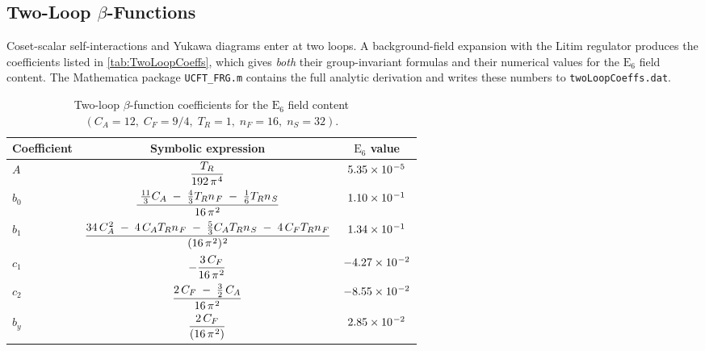 \documentclass[pdflatex,sn-mathphys-num]{sn-jnl}
\theoremstyle{thmstyleone}
\theoremstyle{thmstyletwo}%
\theoremstyle{thmstylethree}%
\newcommand{\sm}{\hspace{.065em}}
\newcommand{\smexp}[1]{^{\sm #1}}
\renewcommand{\arraystretch}{1.25}
\begin{document}
\begin{appendices}
\subsection{Two-Loop \texorpdfstring{$\beta$}{Beta}-Functions}
\label{app:FRG:TwoLoop}

Coset-scalar self-interactions and Yukawa diagrams enter at two loops.
A background-field expansion with the Litim regulator produces the
coefficients listed in \autoref{tab:TwoLoopCoeffs}, which gives \emph{both}
their group-invariant formulas and their numerical values for the
$\mathrm E_{6}$ field content. The Mathematica package \texttt{UCFT\_FRG.m} contains the full analytic derivation and writes these numbers to \texttt{twoLoopCoeffs.dat}.

\begin{table}[h]
\renewcommand{\arraystretch}{1.5}
\centering
\caption{Two-loop $\beta$-function coefficients for the $\mathrm E_{6}$ field content $(C_{A}=12,\;C_{F}=9/4,\;T_{R}=1,\;n_{F}=16,\;n_{S}=32)$.}
\label{tab:TwoLoopCoeffs}
\renewcommand{\arraystretch}{1.35}
\begin{tabular}{lcc}
\hline
Coefficient & Symbolic expression & $\mathrm E_{6}$ value \\ \hline
$\displaystyle A$   &
\rule{0pt}{1.8em} $\dfrac{T_{R}}{192\,\pi\smexp{4}}$ &
$5.35\times10\smexp{-5}$ \\[9pt]

$\displaystyle b_{0}$ &
$\dfrac{\;\tfrac{11}{3}C_{A}\;-\;\tfrac{4}{3}T_{R}n_{\sm F}\;-\;\tfrac16 T_{R}n_{\sm S}}{16\,\pi\smexp{2}}$ &
$1.10\times10\smexp{-1}$ \\[9pt]

$\displaystyle b_{1}$ &
$\dfrac{34\,C_{A}\smexp{2}\;-\;4\,C_{A}T_{R}n_{\sm F}\;-\;\tfrac53 C_{A}T_{R}n_{\sm S}\;-\;4\,C_{F}T_{R}n_{\sm F}}
       {(16\,\pi\smexp{2})\smexp{2}}$ &
$1.34\times10\smexp{-1}$ \\[9pt]

$\displaystyle c_{1}$ &
$-\dfrac{3\,C_{F}}{16\,\pi\smexp{2}}$ &
$-4.27\times10\smexp{-2}$ \\[9pt]

$\displaystyle c_{2}$ &
$\dfrac{2\,C_{F}\;-\;\tfrac32\,C_{A}}{16\,\pi\smexp{2}}$ &
$-8.55\times10\smexp{-2}$ \\[9pt]

$\displaystyle b_{y}$ &
$\dfrac{2\,C_{F}}{(16\,\pi\smexp{2})}$ &
$2.85\times10\smexp{-2}$ \\[9pt] \hline
\end{tabular}
\end{table}


\end{appendices}
\end{document}
